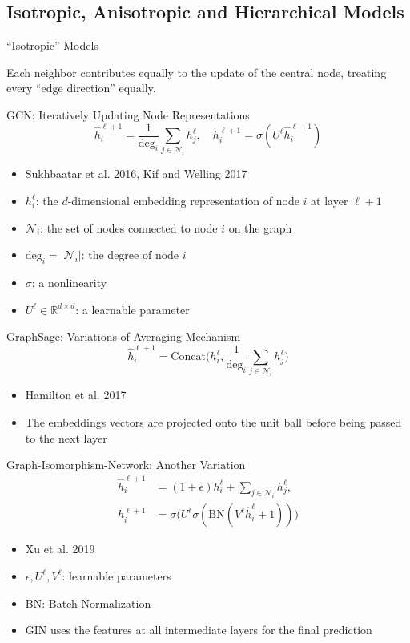 \documentclass{beamer}
\begin{document}
\subsection{Isotropic, Anisotropic and Hierarchical Models}
\begin{frame}{``Isotropic'' Models}
\begin{center}
\huge Each neighbor contributes equally to the update of the central node, treating every ``edge direction'' equally.
\end{center}
\end{frame}
\begin{frame}{GCN: Iteratively Updating Node Representations}
\[
\hat{h}_i^{\ell+1}=\frac{1}{\text{deg}_i}\sum_{j\in\mathcal{N}_i}h_j^\ell,\quad h_i^{\ell+1}=\sigma(U^\ell\hat{h}_i^{\ell+1})
\]
\begin{itemize}
\item Sukhbaatar et al. 2016, Kif and Welling 2017
\item $h_i^\ell$: the $d$-dimensional embedding representation of node $i$ at layer $\ell+1$
\item $\mathcal{N}_i$: the set of nodes connected to node $i$ on the graph
\item $\text{deg}_i=|\mathcal{N}_i|$: the degree of node $i$
\item $\sigma$: a nonlinearity
\item $U^\ell\in\mathbb{R}^{d\times d}$: a learnable parameter
\end{itemize}
\end{frame}
\begin{frame}{GraphSage: Variations of Averaging Mechanism}
\[
\hat{h}_i^{\ell+1}=\text{Concat}\big(h_i^\ell,\frac{1}{\text{deg}_i}\sum_{j\in\mathcal{N}_i}h_j^\ell\big)
\]
\begin{itemize}
\item Hamilton et al. 2017
\item The embeddings vectors are projected onto the unit ball before being passed to the next layer
\end{itemize}
\end{frame}
\begin{frame}{Graph-Isomorphism-Network: Another Variation}
\[
\begin{split}
\hat{h}_i^{\ell+1}&=(1+\epsilon)h_i^\ell+\sum_{j\in\mathcal{N}_i}h_j^\ell,\\
h_i^{\ell+1}&=\sigma\big(U^\ell\sigma(\text{BN}(V^\ell\hat{h}_i^\ell+1))\big)
\end{split}
\]
\begin{itemize}
\item Xu et al. 2019
\item $\epsilon,U^\ell,V^\ell$: learnable parameters
\item BN: Batch Normalization
\item GIN uses the features at all intermediate layers for the final prediction
\end{itemize}
\end{frame}
\end{document}
